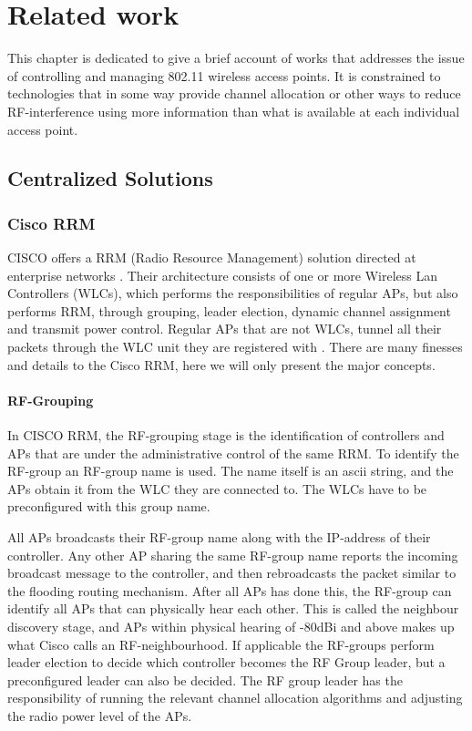 \chapter{Related work}
This chapter is dedicated to give a brief account of works that addresses the issue of controlling and managing 802.11 wireless access points. It is constrained
to technologies that in some way provide channel allocation or other ways to reduce RF-interference using more information than what is available at each individual access point.

\section{Centralized Solutions}

\subsection{Cisco RRM}
CISCO offers a RRM (Radio Resource Management) solution directed at enterprise networks \cite{ciscoRRM}.
Their architecture consists of one or more Wireless Lan Controllers (WLCs), which performs the responsibilities of regular APs, 
but also performs RRM, through grouping, leader election, dynamic channel assignment and transmit power control. Regular APs that 
are not WLCs, tunnel all their packets through the WLC unit they are registered with \cite{cisco_2009}. There are many finesses and details to the Cisco RRM, here we will only present the
major concepts.

\subsubsection{RF-Grouping}
In CISCO RRM, the RF-grouping stage is the identification of controllers and APs that are under the administrative control of the same RRM. 
To identify the RF-group an RF-group name is used. The name itself is an ascii string, and the APs obtain it from the WLC they are connected to. The WLCs have to be preconfigured with this group name.

All APs broadcasts their RF-group name along with the IP-address of their controller.
Any other AP sharing the same RF-group name reports the incoming broadcast message to the controller, and then rebroadcasts the packet similar to the flooding routing mechanism.
After all APs has done this, the RF-group can identify all APs that can physically hear each other.
This is called the neighbour discovery stage, and APs within physical hearing of -80dBi and above makes up what Cisco calls an RF-neighbourhood.
If applicable the RF-groups perform leader election to decide which controller becomes the RF Group leader, but a preconfigured leader can also be decided.
The RF group leader has the responsibility of running the relevant channel allocation algorithms and adjusting the radio power level of the APs. 

